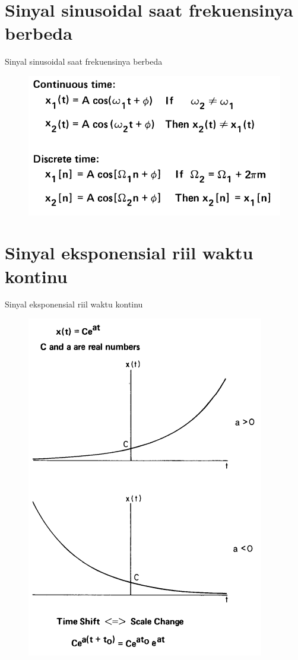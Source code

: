 \documentclass[pdflatex,compress,mathserif]{beamer}
\begin{document}
\section{Sinyal sinusoidal saat frekuensinya berbeda}
\begin{frame}{Sinyal sinusoidal saat frekuensinya berbeda}
	\begin{figure}
		\centering
		\includegraphics[height=0.8\textheight]{img/01.slide_13}
	\end{figure}
\end{frame}

\section{Sinyal eksponensial riil waktu kontinu}
\begin{frame}{Sinyal eksponensial riil waktu kontinu}
	\begin{figure}
		\centering
		\includegraphics[height=0.8\textheight]{img/01.slide_14}
	\end{figure}
\end{frame}
\end{document}
